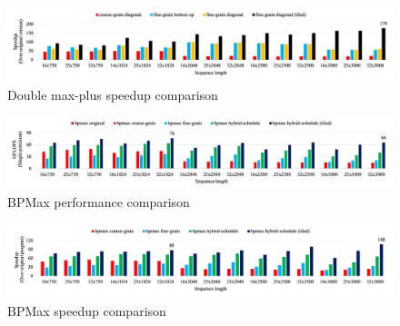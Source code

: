 \begin{figure}[htbp]
 \centerline{\includegraphics[width=\textwidth,scale=1.00, trim=5 5 5 5,clip]{dpm_speed_up_new.png}} 
\caption{Double max-plus speedup comparison}
\label{fig:double_max_plus_speed_up}
\end{figure}


\begin{figure}[htbp]
\centerline{\includegraphics[width=\textwidth,scale=1.00, trim=5 5 5 5,clip]{bpm_performance_new.png}} 
\caption{BPMax performance comparison}
\label{fig:bpm_performance}
\end{figure}

\begin{figure}[htbp]
\centerline{\includegraphics[width=\textwidth,scale=1.00, trim=5 5 5 5,clip]{bpm_speed_up_new.png}} 
\caption{BPMax speedup comparison}
\label{fig:bpm_speed_up}
\end{figure}


